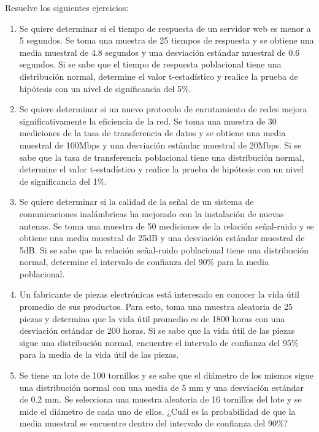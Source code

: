 \begin{Ejer}
Resuelve los siguientes ejercicios:
\begin{enumerate}

\item Se quiere determinar si el tiempo de respuesta de un servidor web es menor a 5 segundos. Se toma una muestra de 25 tiempos de respuesta y se obtiene una media muestral de 4.8 segundos y una desviaci\'on est\'andar muestral de 0.6 segundos. Si se sabe que el tiempo de respuesta poblacional tiene una distribuci\'on normal, determine el valor t-estad\'istico y realice la prueba de hip\'otesis con un nivel de significancia del 5\%.

\item Se quiere determinar si un nuevo protocolo de enrutamiento de redes mejora significativamente la eficiencia de la red. Se toma una muestra de 30 mediciones de la tasa de transferencia de datos y se obtiene una media muestral de 100Mbps y una desviaci\'on est\'andar muestral de 20Mbps. Si se sabe que la tasa de transferencia poblacional tiene una distribuci\'on normal, determine el valor t-estad\'istico y realice la prueba de hip\'otesis con un nivel de significancia del 1\%.

\item Se quiere determinar si la calidad de la se\~nal de un sistema de comunicaciones inal\'ambricas ha mejorado con la instalaci\'on de nuevas antenas. Se toma una muestra de 50 mediciones de la relaci\'on se\~nal-ruido y se obtiene una media muestral de 25dB y una desviaci\'on est\'andar muestral de 5dB. Si se sabe que la relaci\'on se\~nal-ruido poblacional tiene una distribuci\'on normal, determine el intervalo de confianza del 90\% para la media poblacional.

\item Un fabricante de piezas electr\'onicas est\'a interesado en conocer la vida \'util promedio de sus productos. Para esto, toma una muestra aleatoria de 25 piezas y determina que la vida \'util promedio es de 1800 horas con una desviaci\'on est\'andar de 200 horas. Si se sabe que la vida \'util de las piezas sigue una distribuci\'on normal, encuentre el intervalo de confianza del 95\% para la media de la vida \'util de las piezas.

\item Se tiene un lote de 100 tornillos y se sabe que el di\'ametro de los mismos sigue una distribuci\'on normal con una media de 5 mm y una desviaci\'on est\'andar de 0.2 mm. Se selecciona una muestra aleatoria de 16 tornillos del lote y se mide el di\'ametro de cada uno de ellos. ¿Cu\'al es la probabilidad de que la media muestral se encuentre dentro del intervalo de confianza del 90\%?


\end{enumerate}
\end{Ejer}
